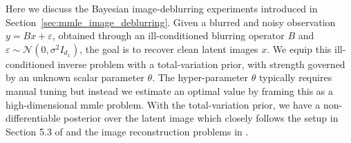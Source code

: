 Here we discuss the Bayesian image-deblurring experiments introduced in Section~\ref{sec:mmle_image_deblurring}. Given a blurred and noisy observation $y=Bx+\varepsilon$, obtained through an ill-conditioned blurring operator $B$ and $\varepsilon\sim\mathcal{N}(0,\sigma^2I_{d_x})$, the goal is to recover clean latent images $x$. We equip this ill-conditioned inverse problem with a total-variation prior, with strength governed by an unknown scalar parameter $\theta$. The hyper-parameter $\theta$ typically requires manual tuning but instead we estimate an optimal value by framing this as a high-dimensional \gls*{mmle} problem. With the total-variation prior, we have a non-differentiable posterior over the latent image which closely follows the setup in Section 5.3 of \citet{encinar2025proximal} and the image reconstruction problems in \citet{durmus2018efficient,goldman2022gradient}.


